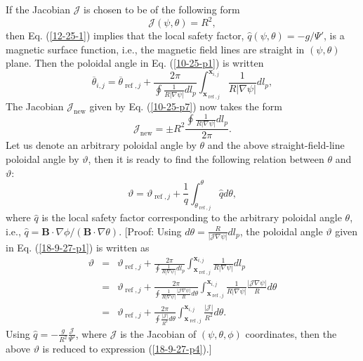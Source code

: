 \documentclass{article}
\newcommand{\tmop}[1]{\ensuremath{\operatorname{#1}}}
\begin{document}
If the Jacobian $\mathcal{J}$ is chosen to be of the following form
\[ \mathcal{J} (\psi, \theta) = R^2, \]
then Eq. (\ref{12-25-1}) implies that the local safety factor, $\hat{q} (\psi,
\theta) = - g / \Psi'$, is a magnetic surface function, i.e., the magnetic
field lines are straight in $(\psi, \theta)$ plane. Then the poloidal angle in
Eq. (\ref{10-25-p1}) is written
\begin{equation}
  \label{18-9-27-p1} \overline{\theta}_{i, j} = \overline{\theta}_{\tmop{ref},
  j} + \frac{2 \pi}{\oint \frac{1}{R | \nabla \psi |} d l_p}
  \int_{\mathbf{x}_{\tmop{ref}, j}}^{\mathbf{x}_{i, j}} \frac{1}{R | \nabla
  \psi |} d l_p,
\end{equation}
The Jacobian $\mathcal{J}_{\tmop{new}}$ given by Eq. (\ref{10-25-p7}) now
takes the form
\begin{equation}
  \mathcal{J}_{\tmop{new}} = \pm R^2 \frac{\oint \frac{1}{R | \nabla \psi |} d
  l_p}{2 \pi} .
\end{equation}
Let us denote an arbitrary poloidal angle by $\theta$ and the above
straight-field-line poloidal angle by $\vartheta$, then it is ready to find
the following relation between $\theta$ and $\vartheta$:
\begin{equation}
  \label{18-9-27-p4} \vartheta = \vartheta_{\tmop{ref}, j} + \frac{1}{q}
  \int_{\theta_{\tmop{ref}, j}}^{\theta} \hat{q} d \theta,
\end{equation}
where $\hat{q}$ is the local safety factor corresponding to the arbitrary
poloidal angle $\theta$, i.e., $\hat{q} =\mathbf{B} \cdot \nabla \phi /
(\mathbf{B} \cdot \nabla \theta)$. [Proof: Using $d \theta =
\frac{R}{|\mathcal{J} \nabla \psi |} d l_p$, the poloidal angle $\vartheta$
given in Eq. (\ref{18-9-27-p1}) is written as
\begin{eqnarray}
  \vartheta & = & \vartheta_{\tmop{ref}, j} + \frac{2 \pi}{\oint \frac{1}{R |
  \nabla \psi |} d l_p} \int_{\mathbf{x}_{\tmop{ref}, j}}^{\mathbf{x}_{i, j}}
  \frac{1}{R | \nabla \psi |} d l_p \nonumber\\
  & = & \vartheta_{\tmop{ref}, j} + \frac{2 \pi}{\oint \frac{1}{R | \nabla
  \psi |} \frac{| \mathcal{J} \nabla \psi |}{R} d \theta}
  \int_{\mathbf{x}_{\tmop{ref}, j}}^{\mathbf{x}_{i, j}} \frac{1}{R | \nabla
  \psi |} \frac{| \mathcal{J} \nabla \psi |}{R} d \theta \nonumber\\
  & = & \vartheta_{\tmop{ref}, j} + \frac{2 \pi}{\oint \frac{| \mathcal{J}
  |}{R^2} d \theta} \int_{\mathbf{x}_{\tmop{ref}, j}}^{\mathbf{x}_{i, j}}
  \frac{| \mathcal{J} |}{R^2} d \theta . 
\end{eqnarray}
Using $\hat{q} = - \frac{g}{R^2}  \frac{\mathcal{J}}{\Psi'}$, where
$\mathcal{J}$ is the Jacobian of $(\psi, \theta, \phi)$ coordinates, then the
above $\vartheta$ is reduced to expression (\ref{18-9-27-p4}).]
\end{document}
